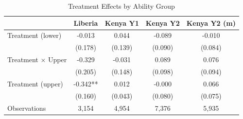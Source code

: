 \begin{table}[htbp]
\centering
\small
\caption{Treatment Effects by Ability Group}
\label{tab:upper_lower}
\begin{tabular}{l*{4}{c}}
\toprule
 & Liberia & Kenya Y1 & Kenya Y2 & Kenya Y2 (m) \\
\midrule
Treatment (lower) & -0.013 & 0.044 & -0.089 & -0.010 \\
 & (0.178) & (0.139) & (0.090) & (0.084) \\
\addlinespace
Treatment $\times$ Upper & -0.329 & -0.031 & 0.089 & 0.076 \\
 & (0.205) & (0.148) & (0.098) & (0.094) \\
\addlinespace
Treatment (upper) & -0.342** & 0.012 & -0.000 & 0.066 \\
 & (0.160) & (0.043) & (0.080) & (0.075) \\
\addlinespace\midrule
Observations & 3,154 & 4,954 & 7,376 & 5,935 \\
\bottomrule
\end{tabular}
\end{table}